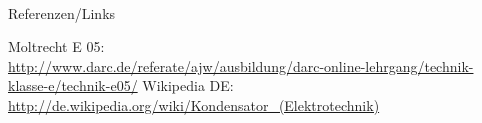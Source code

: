 \renewcommand{\refname}{Referenzen}

\hypertarget{refs}{}
\textcolor{white}{} \\ %
\Large Referenzen/Links
\footnotesize

\begin{thebibliography}{}
     Moltrecht E 05: \\
    \url{http://www.darc.de/referate/ajw/ausbildung/darc-online-lehrgang/technik-klasse-e/technik-e05/}
      Wikipedia DE: \\
    \url{http://de.wikipedia.org/wiki/Kondensator_(Elektrotechnik)}\\
\end{thebibliography}


